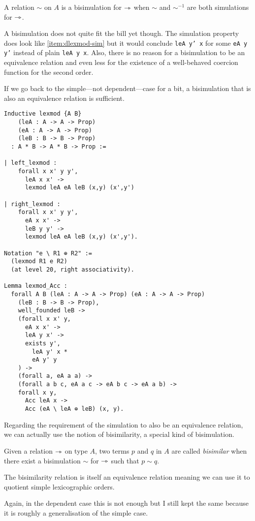 \begin{definition}[Bisimulation]
  A relation \(\sim\) on \(A\) is a bisimulation for \(\rightarrowtriangle\) when \(\sim\)
  and \(\sim^{-1}\) are both simulations for \(\rightarrowtriangle\).
\end{definition}

A bisimulation does not quite fit the bill yet though. The simulation property
does look like \ref{item:dlexmod-sim} but it would conclude
\texttt{leA y' x} for some \texttt{eA y y'} instead of plain
\texttt{leA y x}. Also, there is no reason for a bisimulation to
be an equivalence relation and even less for the existence of a well-behaved
coercion function for the second order.

If we go back to the simple---\ie not dependent---case for a bit, a bisimulation
that is also an equivalence relation is sufficient.

\begin{verbatim}
Inductive lexmod {A B}
    (leA : A -> A -> Prop)
    (eA : A -> A -> Prop)
    (leB : B -> B -> Prop)
  : A * B -> A * B -> Prop :=

| left_lexmod :
    forall x x' y y',
      leA x x' ->
      lexmod leA eA leB (x,y) (x',y')

| right_lexmod :
    forall x x' y y',
      eA x x' ->
      leB y y' ->
      lexmod leA eA leB (x,y) (x',y').

Notation "e \ R1 ⊕ R2" :=
  (lexmod R1 e R2)
  (at level 20, right associativity).

Lemma lexmod_Acc :
  forall A B (leA : A -> A -> Prop) (eA : A -> A -> Prop)
    (leB : B -> B -> Prop),
    well_founded leB ->
    (forall x x' y,
      eA x x' ->
      leA y x' ->
      exists y',
        leA y' x *
        eA y' y
    ) ->
    (forall a, eA a a) ->
    (forall a b c, eA a c -> eA b c -> eA a b) ->
    forall x y,
      Acc leA x ->
      Acc (eA \ leA ⊕ leB) (x, y).
\end{verbatim}

Regarding the requirement of the simulation to also be an equivalence relation,
we can actually use the notion of bisimilarity, a special kind of bisimulation.

\begin{definition}[Bisimularity]
  Given a relation \(\rightarrowtriangle\) on type \(A\), two terms \(p\) and \(q\) in \(A\)
  are called \emph{bisimilar} when there exist a bisimulation \(\sim\) for
  \(\rightarrowtriangle\) such that \(p \sim q\).
\end{definition}

The bisimilarity relation is itself an equivalence relation meaning we can use
it to quotient simple lexicographic orders.

Again, in the dependent case this is not enough but I still kept the same
because it is roughly a generalisation of the simple case.